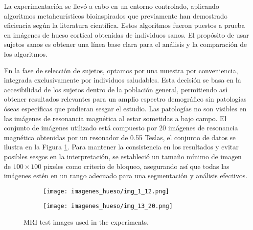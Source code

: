 \documentclass[conference]{IEEEtran}
\begin{document}
\noindent La experimentación se llevó a cabo en un entorno controlado, aplicando algoritmos metaheurísticos bioinspirados que previamente han demostrado eficiencia según la literatura científica. Estos algoritmos fueron puestos a prueba en imágenes de hueso cortical obtenidas de individuos sanos. El propósito de usar sujetos sanos es obtener una línea base clara para el análisis y la comparación de los algoritmos.

\noindent En la fase de selección de sujetos, optamos por una muestra por conveniencia, integrada exclusivamente por individuos saludables. Esta decisión se basa en la accesibilidad de los sujetos dentro de la población general, permitiendo así obtener resultados relevantes para un amplio espectro demográfico sin patologías óseas específicas que pudieran sesgar el estudio. Las patologías no son visibles en las imágenes de resonancia magnética al estar sometidas a bajo campo. El conjunto de imágenes utilizado está compuesto por 20 imágenes de resonancia magnética obtenidas por un resonador de 0.55 Teslas, el conjunto de datos se ilustra en la Figura \ref{fig:imagenes}.
Para mantener la consistencia en los resultados y evitar posibles sesgos en la interpretación, se estableció un tamaño mínimo de imagen de $100\times100$ pixeles como criterio de bloqueo, asegurando así que todas las imágenes estén en un rango adecuado para una segmentación y análisis efectivos.

\begin{figure}
    \centering

    \begin{subfigure}{0.5\textwidth}
        \texttt{[image: imagenes\_hueso/img\_1\_12.png]}
    \end{subfigure}
    
    \begin{subfigure}{0.5\textwidth}
        \texttt{[image: imagenes\_hueso/img\_13\_20.png]}
    \end{subfigure}
    \caption{MRI test images used in the experiments.}
\label{fig:imagenes}    
\end{figure}


\end{document}
